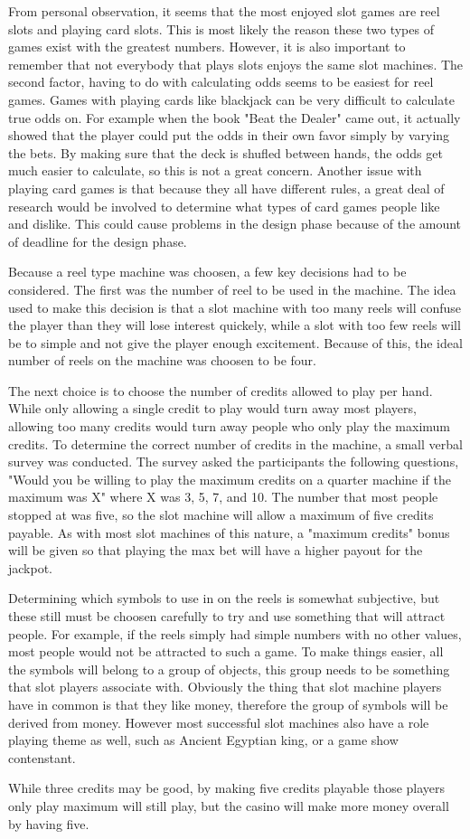 From personal observation, it seems that the most enjoyed slot games are reel slots and playing card slots. This is most likely the reason these two types of games exist with the greatest numbers.  However, it is also important to remember that not everybody that plays slots enjoys the same slot machines.  The second factor, having to do with calculating odds seems to be easiest for reel games.  Games with playing cards like blackjack can be very difficult to calculate true odds on.  For example when the book "Beat the Dealer" came out, it actually showed that the player could put the odds in their own favor simply by varying the bets.  By making sure that the deck is shufled between hands, the odds get much easier to calculate, so this is not a great concern.  Another issue with playing card games is that because they all have different rules, a great deal of research would be involved to determine what types of card games people like and dislike.  This could cause problems in the design phase because of the amount of deadline for the design phase.


Because a reel type machine was choosen, a few key decisions had to be considered.  The first was the number of reel to be used in the machine.  The idea used to make this decision is that a slot machine with too many reels will confuse the player than they will lose interest quickely, while a slot with too few reels will be to simple and not give the player enough excitement.  Because of this, the ideal number of reels on the machine was choosen to be four.

The next choice is to choose the number of credits allowed to play per hand.  While only allowing a single credit to play would turn away most players, allowing too many credits would turn away people who only play the maximum credits.  To determine the correct number of credits in the machine, a small verbal survey was conducted.  The survey asked the participants the following questions, "Would you be willing to play the maximum credits on a quarter machine if the maximum was X" where X was 3, 5, 7, and 10.  The number that most people stopped at was five, so the slot machine will allow a maximum of five credits payable.  As with most slot machines of this nature, a "maximum credits" bonus will be given so that playing the max bet will have a higher payout for the jackpot.

Determining which symbols to use in on the reels is somewhat subjective, but these still must be choosen carefully to try and use something that will attract people.  For example, if the reels simply had simple numbers with no other values, most people would not be attracted to such a game.  To make things easier, all the symbols will belong to a group of objects, this group needs to be something that slot players associate with.  Obviously the thing that slot machine players have in common is that they like money, therefore the group of symbols will be derived from money.  However most successful slot machines also have a role playing theme as well, such as Ancient Egyptian king, or a game show contenstant.

While three credits may be good, by making five credits playable those players only play maximum will still play, but the casino will make more money overall by having five.

